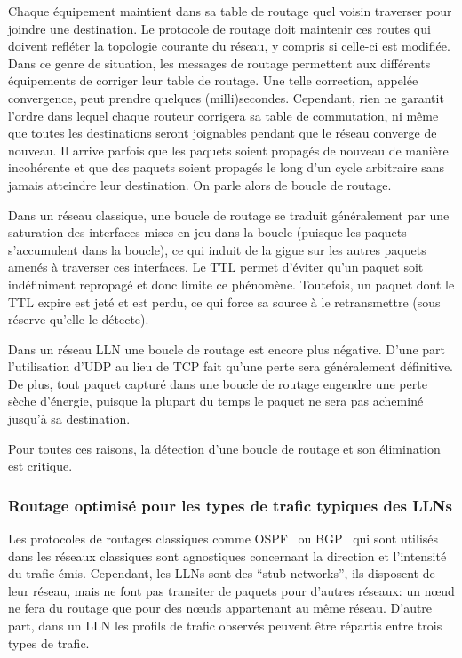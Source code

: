 Chaque équipement maintient dans sa table de routage quel voisin traverser pour joindre une destination.
Le protocole de routage doit maintenir ces routes qui doivent refléter la topologie courante du réseau, y compris si celle-ci est modifiée.
Dans ce genre de situation, les messages de routage permettent aux différents équipements de corriger leur table de routage.
Une telle correction, appelée convergence, peut prendre quelques (milli)secondes.
Cependant, rien ne garantit l'ordre dans lequel chaque routeur corrigera sa table de commutation, ni même que toutes les destinations seront joignables pendant que le réseau converge de nouveau.
Il arrive parfois que les paquets soient propagés de nouveau de manière incohérente et que des paquets soient propagés le long d'un cycle arbitraire sans jamais atteindre leur destination.
On parle alors de boucle de routage.

Dans un réseau classique, une boucle de routage se traduit généralement par une saturation des interfaces mises en jeu dans la boucle (puisque les paquets s'accumulent dans la boucle), ce qui induit de la gigue sur les autres paquets amenés à traverser ces interfaces.
Le \ac{TTL} permet d'éviter qu'un paquet soit indéfiniment repropagé et donc limite ce phénomène.
Toutefois, un paquet dont le \ac{TTL} expire est jeté et est perdu, ce qui force sa source à le retransmettre (sous réserve qu'elle le détecte).

Dans un réseau \ac{LLN} une boucle de routage est encore plus négative.
D'une part l'utilisation d'\ac{UDP} au lieu de \ac{TCP} fait qu'une perte sera généralement définitive.
De plus, tout paquet capturé dans une boucle de routage engendre une perte sèche d'énergie, puisque la plupart du temps le paquet ne sera pas acheminé jusqu'à sa destination.

Pour toutes ces raisons, la détection d'une boucle de routage et son élimination est critique.

\subsubsection{Routage optimisé pour les types de trafic typiques des \ac{LLN}s}

Les protocoles de routages classiques comme \ac{OSPF}~\cite{rfc5340} ou \ac{BGP}~\cite{rfc4271} qui sont utilisés dans les réseaux classiques sont agnostiques concernant la direction et l'intensité du trafic émis.
Cependant, les \ac{LLN}s sont des ``stub networks'', ils disposent de leur réseau, mais ne font pas transiter de paquets pour d'autres réseaux: un nœud ne fera du routage que pour des nœuds appartenant au même réseau.
D'autre part, dans un \ac{LLN} les profils de trafic observés peuvent être répartis entre trois types de trafic.


